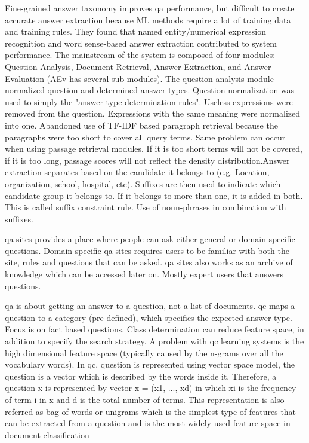 Fine-grained answer taxonomy improves qa performance, but difficult to create accurate answer extraction because ML methods require a lot of training data and training rules. 
They found that named entity/numerical expression recognition and word sense-based answer extraction contributed to system performance.
The mainstream of the system is composed of four modules: Question Analysis, Document Retrieval, Answer-Extraction, and Answer Evaluation (AEv has several sub-modules).
The question analysis module normalized question and determined answer types. Question normalization was used to simply the "answer-type determination rules". Useless expressions were removed from the question. Expressions with the same meaning were normalized into one. Abandoned use of TF-IDF based paragraph retrieval because the paragraphs were too short to cover all query terms. Same problem can occur when using  passage retrieval modules. If it is too short terms will not be covered, if it is too long, passage scores will not reflect the density distribution.Answer extraction separates based on the candidate it belongs to (e.g. Location, organization, school, hospital, etc).  Suffixes are then used to indicate which candidate group it belongs to.  If it belongs to more than one, it is added in both. This is called suffix constraint rule. Use of noun-phrases in combination with suffixes.\cite{Isozaki2005}

qa sites provides a place where people can ask either general or domain specific questions. Domain specific qa sites requires users to be familiar with both the site, rules and questions that can be asked. qa sites also works as an archive of knowledge which can be accessed later on. Mostly expert users that answers questions.
\cite{Movshovitz-Attias2013}

qa is about getting an answer to a question, not a list of documents. qc maps a question to a category (pre-defined), which specifies the expected answer type. Focus is on fact based questions. Class determination can reduce feature space, in addition to specify the search strategy. A problem with qc learning systems is the high dimensional feature space (typically caused by the n-grams over all the vocabulary words).
In qc, question is represented using vector space model, the question is a vector which is described by the words inside it. Therefore, a question x is represented by vector x = (x1, ..., xd) in which xi is the frequency of term i in x and d is the total number of terms. This representation is also referred as bag-of-words or unigrams which is the simplest type of features that can be extracted from a question and is the most widely used feature space in document classification
\cite{Loni2011}


